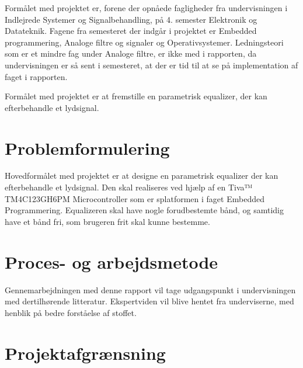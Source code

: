 Formålet med projektet er, forene der opnåede fagligheder fra undervisningen i Indlejrede Systemer og Signalbehandling, på 4. semester Elektronik og Datateknik. Fagene fra semesteret der indgår i projektet er Embedded programmering, Analoge filtre og signaler og Operativsystemer. Ledningsteori som er et mindre fag under Analoge filtre, er ikke med i rapporten, da undervisningen er så sent i semesteret, at der er tid til at se på implementation af faget i rapporten.


Formålet med projektet er at fremstille en parametrisk equalizer, der kan efterbehandle et lydsignal.

\section{Problemformulering}

Hovedformålet med projektet er at designe en parametrisk equalizer der kan efterbehandle et lydsignal. Den skal realiseres ved hjælp af en Tiva™ TM4C123GH6PM Microcontroller som er splatformen i faget Embedded Programmering. Equalizeren skal have nogle forudbestemte bånd, og samtidig have et bånd fri, som brugeren frit skal kunne bestemme.

\section{Proces- og arbejdsmetode}

Gennemarbejdningen med denne rapport vil tage udgangspunkt i undervisningen med dertilhørende litteratur. Ekspertviden vil blive hentet fra underviserne, med henblik på bedre forståelse af stoffet.



\section{Projektafgrænsning}

